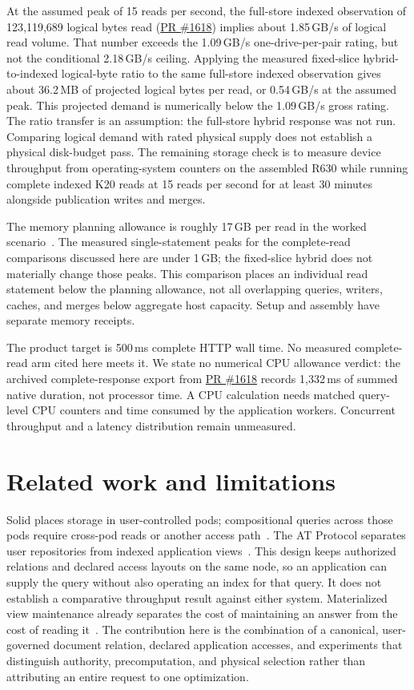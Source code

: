 \documentclass[sigconf,nonacm]{acmart}
\newcommand{\pr}[1]{\href{https://github.com/jacoby149/web10/pull/#1}{PR \##1}}
\begin{document}
At the assumed peak of 15 reads per second, the full-store indexed observation of 123,119,689 logical bytes read (\pr{1618}) implies about 1.85\,GB/s of logical read volume. That number exceeds the 1.09\,GB/s one-drive-per-pair rating, but not the conditional 2.18\,GB/s ceiling. Applying the measured fixed-slice hybrid-to-indexed logical-byte ratio to the same full-store indexed observation gives about 36.2\,MB of projected logical bytes per read, or 0.54\,GB/s at the assumed peak. This projected demand is numerically below the 1.09\,GB/s gross rating. The ratio transfer is an assumption: the full-store hybrid response was not run. Comparing logical demand with rated physical supply does not establish a physical disk-budget pass. The remaining storage check is to measure device throughput from operating-system counters on the assembled R630 while running complete indexed K20 reads at 15 reads per second for at least 30 minutes alongside publication writes and merges.

The memory planning allowance is roughly 17\,GB per read in the worked scenario~\cite{budget}. The measured single-statement peaks for the complete-read comparisons discussed here are under 1\,GB; the fixed-slice hybrid does not materially change those peaks. This comparison places an individual read statement below the planning allowance, not all overlapping queries, writers, caches, and merges below aggregate host capacity. Setup and assembly have separate memory receipts.

The product target is 500\,ms complete HTTP wall time. No measured complete-read arm cited here meets it. We state no numerical CPU allowance verdict: the archived complete-response export from \pr{1618} records 1,332\,ms of summed native duration, not processor time. A CPU calculation needs matched query-level CPU counters and time consumed by the application workers. Concurrent throughput and a latency distribution remain unmeasured.

\section{Related work and limitations}
Solid places storage in user-controlled pods; compositional queries across those pods require cross-pod reads or another access path~\cite{solid}. The AT Protocol separates user repositories from indexed application views~\cite{atproto}. This design keeps authorized relations and declared access layouts on the same node, so an application can supply the query without also operating an index for that query. It does not establish a comparative throughput result against either system. Materialized view maintenance already separates the cost of maintaining an answer from the cost of reading it~\cite{gupta}. The contribution here is the combination of a canonical, user-governed document relation, declared application accesses, and experiments that distinguish authority, precomputation, and physical selection rather than attributing an entire request to one optimization.
\end{document}
